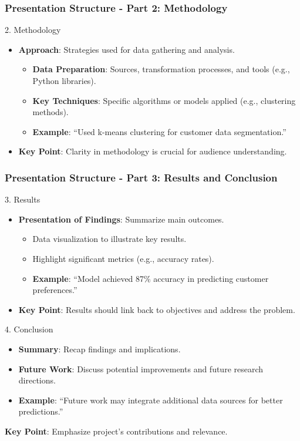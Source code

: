 \documentclass[aspectratio=169]{beamer}
\begin{document}
\begin{frame}[fragile]
    \frametitle{Presentation Structure - Part 2: Methodology}
    \begin{block}{2. Methodology}
        \begin{itemize}
            \item \textbf{Approach}: Strategies used for data gathering and analysis.
            \begin{itemize}
                \item \textbf{Data Preparation}: Sources, transformation processes, and tools (e.g., Python libraries).
                \item \textbf{Key Techniques}: Specific algorithms or models applied (e.g., clustering methods).
                \item \textbf{Example}: “Used k-means clustering for customer data segmentation.”
            \end{itemize}
            \item \textbf{Key Point}: Clarity in methodology is crucial for audience understanding.
        \end{itemize}
    \end{block}
\end{frame}

\begin{frame}[fragile]
    \frametitle{Presentation Structure - Part 3: Results and Conclusion}
    \begin{block}{3. Results}
        \begin{itemize}
            \item \textbf{Presentation of Findings}: Summarize main outcomes.
            \begin{itemize}
                \item Data visualization to illustrate key results.
                \item Highlight significant metrics (e.g., accuracy rates).
                \item \textbf{Example}: “Model achieved 87\% accuracy in predicting customer preferences.”
            \end{itemize}
            \item \textbf{Key Point}: Results should link back to objectives and address the problem.
        \end{itemize}
    \end{block}
    
    \begin{block}{4. Conclusion}
        \begin{itemize}
            \item \textbf{Summary}: Recap findings and implications.
            \item \textbf{Future Work}: Discuss potential improvements and future research directions.
            \item \textbf{Example}: “Future work may integrate additional data sources for better predictions.”
        \end{itemize}
        \item \textbf{Key Point}: Emphasize project's contributions and relevance.
    \end{block}
\end{frame}
\end{document}
